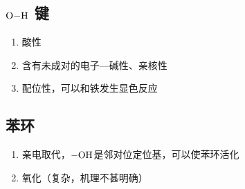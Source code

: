 \documentclass[a4paper]{ctexrep}
\begin{document}
    \subsection{$\ce{O-H}$ 键}
    \begin{enumerate}
        \item 酸性
        \item 含有未成对的电子---碱性、亲核性
        \item 配位性，可以和铁发生显色反应
    \end{enumerate}

    \subsection{苯环}
    \begin{enumerate}
        \item 亲电取代，$\ce{-OH}$是邻对位定位基，可以使苯环活化
        \item 氧化（复杂，机理不甚明确）
    \end{enumerate}
\end{document}
